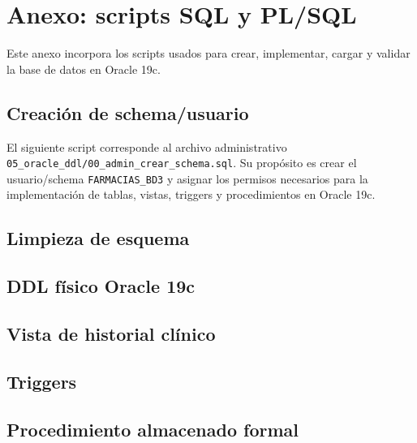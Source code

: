 \section{Anexo: scripts SQL y PL/SQL}

Este anexo incorpora los scripts usados para crear, implementar, cargar y validar la base de datos en Oracle 19c.

\subsection{Creación de schema/usuario}

El siguiente script corresponde al archivo administrativo \texttt{05\_oracle\_ddl/00\_admin\_crear\_schema.sql}. Su propósito es crear el usuario/schema \texttt{FARMACIAS\_BD3} y asignar los permisos necesarios para la implementación de tablas, vistas, triggers y procedimientos en Oracle 19c.



\subsection{Limpieza de esquema}



\subsection{DDL físico Oracle 19c}



\subsection{Vista de historial clínico}



\subsection{Triggers}



\subsection{Procedimiento almacenado formal}

